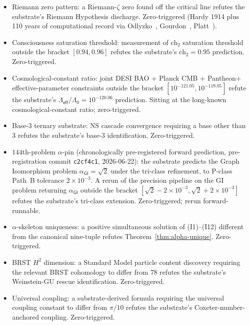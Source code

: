 \documentclass[11pt,a4paper]{amsart}
\theoremstyle{plain}
\theoremstyle{definition}
\begin{document}
\begin{itemize}[itemsep=2pt,leftmargin=2em]
\item[F1] Riemann zero pattern: a Riemann-$\zeta$ zero found off the critical line refutes the substrate's Riemann Hypothesis discharge. Zero-triggered (Hardy 1914 plus 110 years of computational record via Odlyzko~\cite{odlyzko1992}, Gourdon~\cite{gourdon2004}, Platt~\cite{platt2017}).
\item[F2] Consciousness saturation threshold: measurement of $\mathrm{ch}_{2}$ saturation threshold outside the bracket $[0.94, 0.96]$ refutes the substrate's $\mathrm{ch}_{2} = 0.95$ prediction. Zero-triggered.
\item[F3] Cosmological-constant ratio: joint DESI BAO + Planck CMB + Pantheon$+$ effective-parameter constraints outside the bracket $[10^{-121.05}, 10^{-119.05}]$ refute the substrate's $\Lambda_{\textsf{eff}}/\Lambda_{0} = 10^{-120.06}$ prediction. Sitting at the long-known cosmological-constant ratio; zero-triggered.
\item[F4] Base-3 ternary substrate: NS cascade convergence requiring a base other than 3 refutes the substrate's base-3 identification. Zero-triggered.
\item[F5] $144$th-problem $\alpha$-pin (chronologically pre-registered forward prediction, pre-registration commit \texttt{c2cf4c1}, 2026-06-22): the substrate predicts the Graph Isomorphism problem $\alpha_{\textsf{GI}} = \sqrt{2}$ under the tri-class refinement, to P-class Path~B tolerance $2 \times 10^{-3}$. A rerun of the precision pipeline on the GI problem returning $\alpha_{\textsf{GI}}$ outside the bracket $[\sqrt{2} - 2\times 10^{-3}, \sqrt{2} + 2 \times 10^{-3}]$ refutes the substrate's tri-class extension. Zero-triggered; rerun forward-runnable.
\item[F6] $\alpha$-skeleton uniqueness: a positive simultaneous solution of \textup{(I1)--(I12)} different from the canonical nine-tuple refutes Theorem~\ref{thm:alpha-unique}. Zero-triggered.
\item[F7] BRST $H^{2}$ dimension: a Standard Model particle content discovery requiring the relevant BRST cohomology to differ from $78$ refutes the substrate's Weinstein-GU rescue identification. Zero-triggered.
\item[F8] Universal coupling: a substrate-derived formula requiring the universal coupling constant to differ from $\pi/10$ refutes the substrate's Coxeter-number-anchored coupling. Zero-triggered.
\end{itemize}
\end{document}
